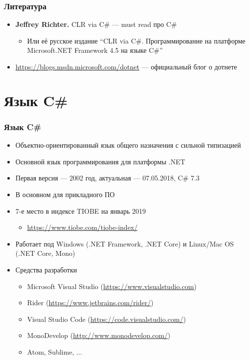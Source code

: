 \documentclass[xetex,mathserif,serif]{beamer}
\begin{document}
	\begin{frame}
	\frametitle{Литература}
		\begin{itemize}
			\item \textbf{Jeffrey Richter.} CLR via C\# --- must read про C\#
			\begin{itemize}
				\item Или её русское издание ``CLR via C\#. Программирование на платформе Microsoft.NET Framework 4.5 на языке C\#''
			\end{itemize}
			\item \url{https://blogs.msdn.microsoft.com/dotnet} --- официальный блог о дотнете
		\end{itemize}
	\end{frame}

	\section{Язык C\#}

	\begin{frame}
		\frametitle{Язык C\#}
		\begin{itemize}
			\item Объектно-ориентированный язык общего назначения с сильной типизацией
			\item Основной язык программирования для платформы .NET
			\item Первая версия --- 2002 год, актуальная --- 07.05.2018, C\# 7.3
			\item В основном для прикладного ПО
			\item 7-е место в индексе TIOBE на январь 2019
			\begin{itemize}
				\item \url{https://www.tiobe.com/tiobe-index/}
			\end{itemize}
			\item Работает под Windows (.NET Framework, .NET Core) и Linux/Mac OS (.NET Core, Mono)
			\item Средства разработки
			\begin{itemize}
				\item Microsoft Visual Studio (\url{https://www.visualstudio.com})
				\item Rider (\url{https://www.jetbrains.com/rider/})
				\item Visual Studio Code (\url{https://code.visualstudio.com/})
				\item MonoDevelop (\url{http://www.monodevelop.com/})
				\item Atom, Sublime, ...
			\end{itemize}
		\end{itemize}
	\end{frame}
\end{document}
